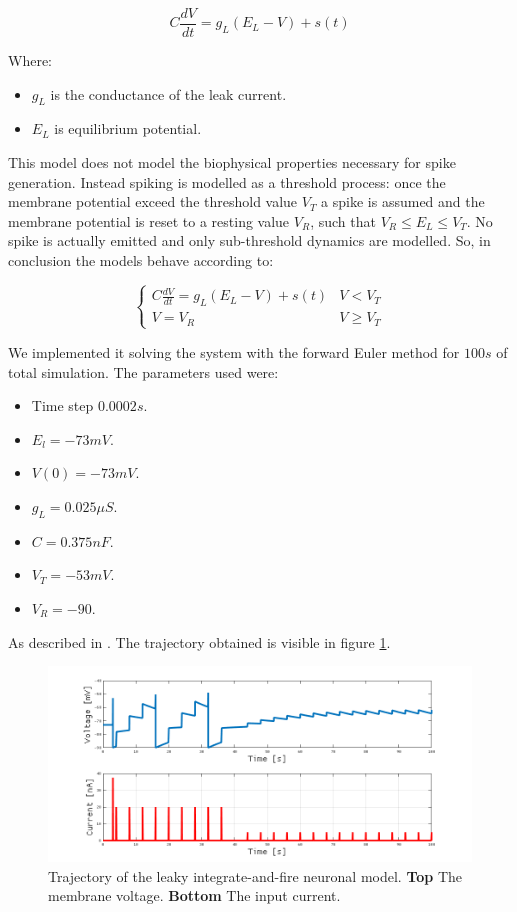 		$$C\frac{dV}{dt} = g_L(E_L-V)+s(t)$$

		Where:

		\begin{itemize}
			\item $g_L$ is the conductance of the leak current.
			\item $E_L$ is equilibrium potential.
		\end{itemize}

		This model does not model the biophysical properties necessary for spike generation.
		Instead spiking is modelled as a threshold process: once the membrane potential exceed the threshold value $V_T$ a spike is assumed and the membrane potential is reset to a resting value $V_R$, such that $V_R\le E_L\le V_T$.
		No spike is actually emitted and only sub-threshold dynamics are modelled.
		So, in conclusion the models behave according to:

		$$\begin{cases}C\frac{dV}{dt} = g_L(E_L-V)+s(t) & V< V_T\\V = V_R & V\ge V_T\end{cases}$$

		We implemented it solving the system with the forward Euler method for $100s$ of total simulation.
		The parameters used were:

		\begin{multicols}{2}
			\begin{itemize}
				\item Time step $0.0002s$.
				\item $E_l = -73mV$.
				\item $V(0) = -73mV$.
				\item $g_L = 0.025\mu S$.
				\item $C = 0.375 nF$.
				\item $V_T = -53mV$.
				\item $V_R = -90$.
			\end{itemize}
		\end{multicols}

		As described in \cite{stochastic-neuron}.
		The trajectory obtained is visible in figure \ref{fig:integrate-fire}.

		\begin{figure}
			\includegraphics[width=\textwidth]{Figures/integrate-fire}
			\caption{Trajectory of the leaky integrate-and-fire neuronal model. \textbf{Top} The membrane voltage. \textbf{Bottom} The input current.}
			\label{fig:integrate-fire}
		\end{figure}

